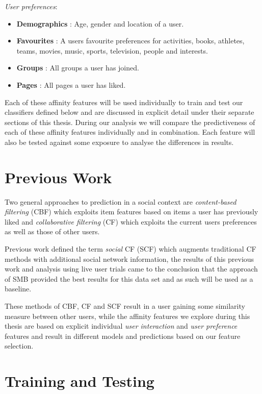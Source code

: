 \emph{User preferences}:
\begin{itemize}
\item \textbf{Demographics} : Age, gender and location of a user.
\item \textbf{Favourites} : A users favourite preferences for activities, books, athletes, teams, movies, music, sports, television, people and interests.
\item \textbf{Groups} : All groups a user has joined.
\item \textbf{Pages} :  All pages a user has liked.
\end{itemize}

Each of these affinity features will be used individually to train and test our classifiers defined below and are discussed 
in explicit detail under their separate sections of this thesis.
During our analysis we will compare the predictiveness of each of these affinity features individually and in combination.
Each feature will also be tested against some exposure to analyse the differences in results.

\section{Previous Work}
\label{sec:pw}

Two general approaches to prediction in a social context are \emph{content-based filtering} (CBF) \cite{newsweeder} which exploits 
item features based on items a user has previously liked and  \emph{collaborative filtering} (CF) 
\cite{collab_filtering} which exploits the current users preferences as well as those of other users. 

Previous work defined the term \emph{social} CF (SCF) \cite{joseph} which augments traditional CF methods with additional social 
network information, the results of this previous work and analysis using live user trials came to the conclusion that the approach of SMB
provided the best results for this data set and as such will be used as a baseline.

These methods of CBF, CF and SCF result in a user gaining some similarity measure between other users, while the affinity features we 
explore during this thesis are based on explicit individual \emph{user interaction} and \emph{user preference} features and result in different 
models and predictions based on our feature selection.

\section{Training and Testing}
\label{sec:tt}

